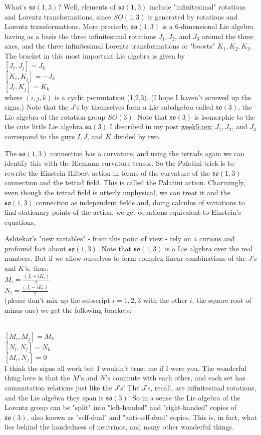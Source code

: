 What's $\mathfrak{so}(1,3)$? Well, elements of $\mathfrak{so(1,3)}$ include "infinitesimal" rotations and Lorentz transformations, since $SO(1,3)$ is generated by rotations and Lorentz transformations. More precisely, $\mathfrak{so(1,3)}$ is a 6-dimensional Lie algebra having as a basis the three infinitesimal rotations $J_1, J_2$, and $J_3$ around the three axes, and the three infinitesimal Lorentz transformations or "boosts" $K_1, K_2, K_3$. The bracket in this most important Lie algebra is given by\\
$[J_i,J_j] = J_k$\\
$[K_i,K_j] = -J_k$\\
$[J_i,K_j] = K_k$\\
where $(i,j,k)$ is a cyclic permutation (1,2,3). (I hope I haven't screwed up the signs.) Note that the $J$'s by themselves form a Lie subalgebra called $\mathfrak{so}(3)$, the Lie algebra of the rotation group $SO(3)$. Note that $\mathfrak{so}(3)$ is isomorphic to the the cute little Lie algebra $\mathfrak{su}(3)$ I described in my post {\hyperref[week5]{week5.tex}}; $J_1, J_2$, and $J_3$ correspond to the guys $I, J$, and $K$ divided by two.

The $\mathfrak{so(1,3)}$ connection has a curvature, and using the tetrads again we can identify this with the Riemann curvature tensor. So the Palatini trick is to rewrite the Einstein-Hilbert action in terms of the curvature of the $\mathfrak{so(1,3)}$ connection and the tetrad field. This is called the Palatini action. Charmingly, even though the tetrad field is utterly unphysical, we can treat it and the $\mathfrak{so(1,3)}$ connection as independent fields and, doing calculus of variations to find stationary points of the action, we get equations equivalent to Einstein's equations.

Ashtekar's "new variables" - from this point of view - rely on a curious and profound fact about $\mathfrak{so(1,3)}$. Note that $\mathfrak{so(1,3)}$ is a Lie algebra over the real numbers. But if we allow ourselves to form complex linear combinations of the $J$'s and $K$'s, thus:
\\
$M_i = \frac{(J_i + iK_i)}{2}$\\
$N_i = \frac{(J_i - iK_i)}{2}$\\
(please don't mix up the subscript $i = 1,2,3$ with the other $i$, the square root of minus one) we get the following brackets:

\\
$[M_i,M_j] = M_k$\\
$[N_i,N_j] = N_k$\\
$[M_i,N_j] = 0$\\
I think the signs all work but I wouldn't trust me if I were you. The wonderful thing here is that the $M$'s and $N$'s commute with each other, and each set has commutation relations just like the $J$'s! The $J$'s, recall, are infinitesimal rotations, and the Lie algebra they span is $\mathfrak{so}(3)$. So in a sense the Lie algebra of the Lorentz group can be "split" into "left-handed" and "right-handed" copies of $\mathfrak{so}(3)$, also known as "self-dual" and "anti-self-dual" copies. This is, in fact, what lies behind the handedness of neutrinos, and many other wonderful things.

